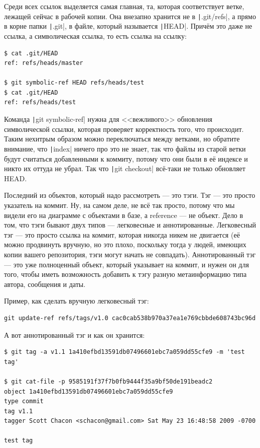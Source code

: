 \documentclass[a5paper]{article}
\begin{document}
Среди всех ссылок выделяется самая главная, та, которая соответствует ветке, лежащей сейчас в рабочей копии. Она внезапно хранится не в \texttt|.git/refs|, а прямо в корне папки \texttt|.git|, в файле, который называется \texttt|HEAD|. Причём это даже не ссылка, а символическая ссылка, то есть ссылка на ссылку:

\begin{verbatim}
$ cat .git/HEAD
ref: refs/heads/master

$ git symbolic-ref HEAD refs/heads/test
$ cat .git/HEAD
ref: refs/heads/test
\end{verbatim}

Команда \texttt|git symbolic-ref| нужна для <<вежливого>> обновления символической ссылки, которая проверяет корректность того, что происходит. Таким нехитрым образом можно переключаться между ветками, но обратите внимание, что \texttt|index| ничего про это не знает, так что файлы из старой ветки будут считаться добавленными к коммиту, потому что они были в её индексе и никто их оттуда не убрал. Так что \texttt|git checkout| всё-таки не только обновляет HEAD.

Последний из объектов, который надо рассмотреть --- это тэги. Тэг --- это просто указатель на коммит. Ну, на самом деле, не всё так просто, потому что мы видели его на диаграмме с объектами в базе, а reference --- не объект. Дело в том, что тэги бывают двух типов --- легковесные и аннотированные. Легковесный тэг --- это просто ссылка на коммит, которая никогда никем не двигается (её можно продвинуть вручную, но это плохо, поскольку тогда у людей, имеющих копии вашего репозитория, тэги могут начать не совпадать). Аннотированный тэг --- это уже полноценный объект, который указывает на коммит, и нужен он для того, чтобы иметь возможность добавить к тэгу разную метаинформацию типа автора, сообщения и даты.

Пример, как сделать вручную легковесный тэг:
\begin{verbatim}
git update-ref refs/tags/v1.0 cac0cab538b970a37ea1e769cbbde608743bc96d
\end{verbatim}

А вот аннотированный тэг и как он хранится:
\begin{verbatim}
$ git tag -a v1.1 1a410efbd13591db07496601ebc7a059dd55cfe9 -m 'test tag'

$ git cat-file -p 9585191f37f7b0fb9444f35a9bf50de191beadc2
object 1a410efbd13591db07496601ebc7a059dd55cfe9
type commit
tag v1.1
tagger Scott Chacon <schacon@gmail.com> Sat May 23 16:48:58 2009 -0700

test tag
\end{verbatim}
\end{document}
